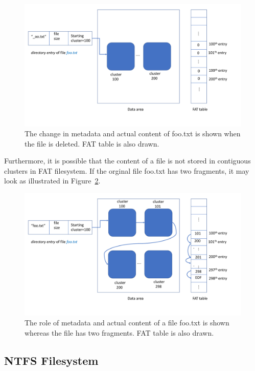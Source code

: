 \begin{figure}[h]
    \centering
    \includegraphics[width=\linewidth]{fig/fat2.pdf}
    \caption{The change in metadata and actual content of foo.txt is shown when the file is deleted. FAT table is also drawn.}
    \label{fig:fat2}
\end{figure}

Furthermore, it is possible that the content of a file is not stored in contiguous clusters in FAT filesystem. 
If the orginal file foo.txt has two fragments, it may look as illustrated in Figure~\ref{fig:fat3}.

\begin{figure}[h]
    \centering
    \includegraphics[width=\linewidth]{fig/fat3.pdf}
    \caption{The role of metadata and actual content of a file foo.txt is shown whereas the file has two fragments. FAT table is also drawn.}
    \label{fig:fat3}
\end{figure}
\subsection{NTFS Filesystem}

